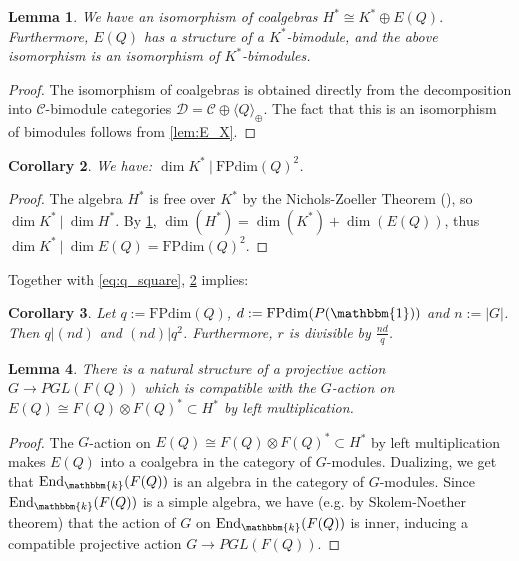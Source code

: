 \documentclass{amsart}
\theoremstyle{plain}%
\newtheorem{lemma}{Lemma}[subsection]
\newtheorem{corollary}[lemma]{Corollary}
\theoremstyle{remark}
\newcommand{\C}{\mathcal{C}}
\newcommand{\1}{\mathbbm{1}}
\newcommand{\D}{\mathcal{D}}
\newcommand{\End}{\mathrm{End}}
\newcommand{\FPdim}{\mathrm{FPdim}}
\newcommand{\kk}{\mathbbm{k}}
\begin{document}
\begin{lemma}\label{lemma: decomposition as coalgebras}
        We have an isomorphism of coalgebras $H^*\cong K^*\oplus E(Q).$ Furthermore, $E(Q)$ has a structure of a $K^*$-bimodule, and the above isomorphism is an isomorphism of $K^*$-bimodules. 
    \end{lemma}
    \begin{proof}
        The isomorphism of coalgebras is obtained directly from the decomposition into $\C$-bimodule categories $\D=\C\oplus \langle Q\rangle_{\oplus}$. The fact that this is an isomorphism of bimodules follows from \cref{lem:E_X}.
    \end{proof}
    \begin{corollary}\label{crl: dim(K) divides q^2}
        We have: $\dim K^* ~\rvert~ \FPdim(Q)^2$.
    \end{corollary}
    \begin{proof}
        The algebra $H^*$ is free over $K^*$ by the Nichols-Zoeller Theorem (\cite{NZ}), so $\dim K^* ~\rvert~\dim H^*$. By \cref{lemma: decomposition as coalgebras}, $\dim(H^*) = \dim(K^*)+\dim(E(Q))$, thus $\dim K^* ~\rvert~\dim E(Q)=\FPdim(Q)^2$.
    \end{proof}
Together with \cref{eq:q_square}, \cref{crl: dim(K) divides q^2} implies:
    \begin{corollary}\label{cor:divisibility}
        Let $q:=\FPdim(Q)$, $d:=\FPdim (P(\1))$ and $n:=|G|$. Then $q|(nd)$ and $(nd)|q^2$. Furthermore, $r$ is divisible by $\frac{nd}{q}$.
    \end{corollary}
    \begin{lemma}\label{lem:projective_G_rep}
        There is a natural structure of a projective action $G\to PGL(F(Q))$ which is compatible with the $G$-action on $E(Q)\cong F(Q)\otimes F(Q)^*\subset H^*$ by left multiplication.
    \end{lemma}
    \begin{proof}
        The $G$-action on $E(Q)\cong F(Q)\otimes F(Q)^*\subset H^*$ by left multiplication makes $E(Q)$ into a coalgebra in the category of $G$-modules. Dualizing, we get that $\End_{\kk}(F(Q))$ is an algebra in the category of $G$-modules. Since $\End_{\kk}(F(Q))$ is a simple algebra, we have (e.g. by Skolem-Noether theorem) that the action of $G$ on $\End_{\kk}(F(Q))$ is inner, inducing a compatible projective action $G\to PGL(F(Q))$.
    \end{proof}
    
\end{document}
